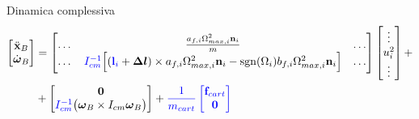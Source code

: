 \documentclass[]{beamer}
\DeclareMathOperator*{\sgn}{sgn}                %
\begin{document}
	\begin{frame}
		\centering
		\begin{columns}
			\begin{column}{.4\textwidth}
				\centering
				\begin{figure}
					
				\end{figure}					
			\end{column}
			\begin{column}{.4\textwidth}
				\centering
				\begin{figure}
					
				\end{figure}					
			\end{column}
		\end{columns}
		\begin{block}{Dinamica complessiva}
			\tiny
			\begin{equation*}
			\begin{split}
				\begin{bmatrix}
					\ddot{\mathbf{x}}_B \\
					\dot{\boldsymbol{\omega}}_B
				\end{bmatrix}
				&=
				\begin{bmatrix}
					\dots & \frac{a_{f,i}\Omega_{max,i}^2\mathbf{n}_i}{m} & \dots \\
					\dots & \textcolor{blue}{I_{cm}^{-1}}\Big[ (\textcolor{blue}{\mathbf{l}_i}+\boldsymbol{\Delta l})\times a_{f,i}\Omega^2_{max,i}\mathbf{n}_i-\sgn(\Omega_i)b_{f,i}\Omega_{max,i}^2\mathbf{n}_i\Big] & \dots
				\end{bmatrix}
				\begin{bmatrix}
					\vdots \\
					u_i^2 \\
					\vdots
				\end{bmatrix}
					+ \\
					&+
				\begin{bmatrix}
					\mathbf{0} \\
					\textcolor{blue}{I_{cm}^{-1}}\bigl(\boldsymbol{\omega}_B \times I_{cm} \boldsymbol{\omega}_B \bigl)
				\end{bmatrix}
				+
				\textcolor{blue}{
				\frac{1}{m_{cart}}
				\begin{bmatrix}
					\mathbf{f}_{cart} \\
					\mathbf{0}
				\end{bmatrix} 
				}
			\end{split}
			\end{equation*}
		\end{block}
	\end{frame}
\end{document}
